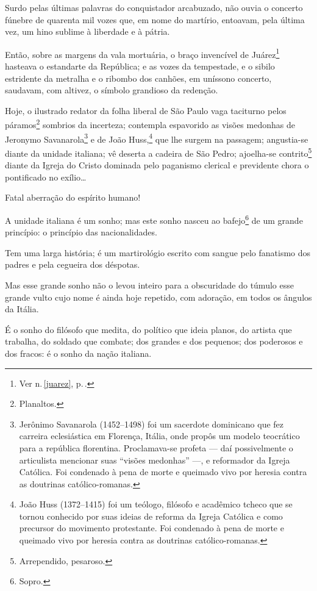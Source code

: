 Surdo pelas últimas palavras do conquistador arcabuzado, não ouvia o
concerto fúnebre de quarenta mil vozes que, em nome do martírio,
entoavam, pela última vez, um hino sublime à liberdade e à pátria.

Então, sobre as margens da vala mortuária, o braço invencível de
Juárez\footnote{Ver n.\,\ref{juarez}, p.\,\pageref{juarez}.} hasteava o estandarte da República; e as vozes da tempestade,
e o sibilo estridente da metralha e o ribombo dos canhões, em uníssono
concerto, saudavam, com altivez, o símbolo grandioso da redenção.

Hoje, o ilustrado redator da folha liberal de São Paulo vaga taciturno
pelos páramos\footnote{Planaltos.} sombrios da incerteza; contempla
espavorido as visões medonhas de Jeronymo Savanarola\footnote{Jerônimo
  Savanarola (1452--1498) foi um sacerdote dominicano que fez carreira
  eclesiástica em Florença, Itália, onde propôs um modelo teocrático
  para a república florentina. Proclamava-se profeta --- daí
  possivelmente o articulista mencionar suas ``visões medonhas'' ---, e
  reformador da Igreja Católica. Foi condenado à pena de morte e
  queimado vivo por heresia contra as doutrinas católico-romanas.} e de
João Huss,\footnote{João Huss (1372--1415) foi um teólogo, filósofo e
  acadêmico tcheco que se tornou conhecido por suas ideias de reforma da
  Igreja Católica e como precursor do movimento protestante. Foi
  condenado à pena de morte e queimado vivo por heresia contra as
  doutrinas católico-romanas.} que lhe surgem na passagem; angustia-se
diante da unidade italiana; vê deserta a cadeira de São Pedro;
ajoelha-se contrito\footnote{Arrependido, pesaroso.} diante da Igreja
do Cristo dominada pelo paganismo clerical e previdente chora o
pontificado no exílio\ldots{}

Fatal aberração do espírito humano!

A unidade italiana é um sonho; mas este sonho nasceu ao
bafejo\footnote{Sopro.} de um grande princípio: o princípio das
nacionalidades.

Tem uma larga história; é um martirológio escrito com sangue pelo
fanatismo dos padres e pela cegueira dos déspotas.

Mas esse grande sonho não o levou inteiro para a obscuridade do túmulo
esse grande vulto cujo nome é ainda hoje repetido, com adoração, em
todos os ângulos da Itália.

É o sonho do filósofo que medita, do político que ideia planos, do
artista que trabalha, do soldado que combate; dos grandes e dos
pequenos; dos poderosos e dos fracos: é o sonho da nação italiana.

